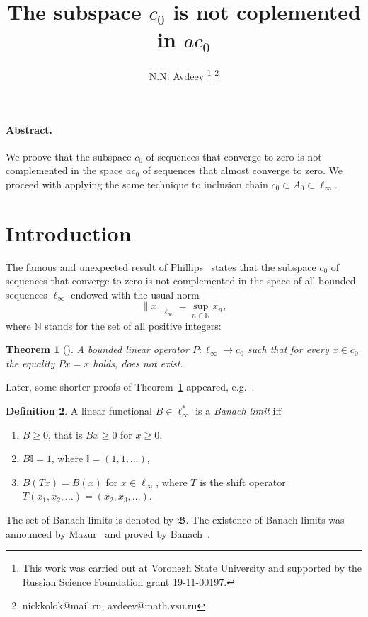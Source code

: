 \documentclass[a4paper,14pt]{article} %
\theoremstyle{plain}
\newtheorem{theorem}{Theorem}[section]
\theoremstyle{definition}
\newtheorem{definition}[theorem]{Definition}
\begin{document}

\title{
	The subspace $c_0$ is not coplemented in $ac_0$
}

\author{
	N.N. Avdeev
	\footnote{
		This work was carried out at Voronezh State University and supported by the Russian Science
		Foundation grant 19-11-00197.
	}
	\footnote{nickkolok@mail.ru, avdeev@math.vsu.ru}
}

\maketitle

\paragraph{Abstract.}
We proove that the subspace $c_0$ of sequences that converge to zero
is not complemented in the space $ac_0$ of sequences that almost converge to zero.
We proceed with applying the same technique to inclusion chain $c_0\subset A_0 \subset \ell_\infty$.




\section{Introduction}


The famous and unexpected result of Phillips~\cite{phillips1940linear}
states that the subspace $c_0$ of sequences that converge to zero
is not complemented in the space of all bounded sequences $\ell_\infty$
endowed with the usual norm
\begin{equation}
	\|x\|_{\ell_\infty} = \sup_{n\in\mathbb{N}} x_n
	,
\end{equation}
where $\mathbb{N}$ stands for the set of all positive integers:

\begin{theorem}[\cite{phillips1940linear}]
	\label{thm:phillips}
	A bounded linear operator $P: \ell_\infty \to c_0$ such that for every
	$x \in c_0$ the equality $Px =x$ holds,
	does not exist.
\end{theorem}

Later, some shorter proofs of Theorem~\ref{thm:phillips} appeared, e.g.~\cite{whitley1968projecting}.


\begin{definition}
	A linear functional $B\in\ell_\infty^*$ is a \emph{Banach limit} iff
	\begin{enumerate}[label=(\roman*)]
		\item
			$B\geq0$, that is $Bx \geq 0$ for $x \geq 0$,
		\item
			$B\mathbb{I}=1$, where $\mathbb{I} =(1,1,\ldots)$,
		\item
			$B(Tx)=B(x)$ for $x\in \ell_\infty$,
			where $T$ is the shift operator $T(x_1,x_2,\ldots)=(x_2,x_3,\ldots)$.
	\end{enumerate}
\end{definition}
The set of Banach limits is denoted by $\mathfrak{B}$.
The existence of Banach limits was announced by Mazur~\cite{Mazur} and proved by Banach~\cite{banach1993theorie}.
\end{document}
